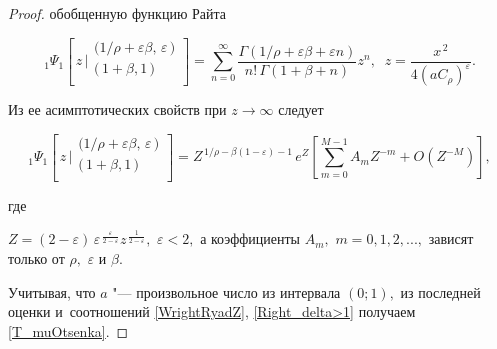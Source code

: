 \begin{proof}
обобщенную функцию Райта

$$

{_1\Psi_{1}}\left[ \,z \,\bigg|

\begin{array}{ll}

 \big(1/\rho+\varepsilon\beta, \,\varepsilon\,\big)\\

\big(\,1+\beta, 1\,\big)\\

\end{array}

\right]=

\sum\limits_{n=0}^{\infty}

\frac{\Gamma\left(1/\rho+\varepsilon\beta+\varepsilon n\right)}{n!

\,\Gamma(1+\beta+n)} z^{n}, \; \; z=\frac{x^{\,2}}{4(aC_{\rho})^{\varepsilon}}.

$$

Из ее асимптотических свойств при $z\to \infty$ следует~\cite{Wright}

$$

{_1\Psi_{1}}\left[ \,z\,\bigg|

\begin{array}{ll}

 \big(1/\rho+\varepsilon\beta, \,\varepsilon\,\big)\\

\big(\,1+\beta, 1\,\big)\\

\end{array}

\right]=Z^{\,1/\rho-\beta(1-\varepsilon)-1}\,e^{Z}

\left[ \sum\limits_{m=0}^{M-1}A_m Z^{-m}+O\left(Z^{-M}\right) \right],

$$

где

$Z=(2-\varepsilon)\,\varepsilon^{\,\frac{\varepsilon}{2-\varepsilon}}z^{\,\frac{1}{2-\varepsilon}},$  $\varepsilon<2,$ а коэффициенты $A_m,$ $m=0, 1, 2, ...,$ зависят только от $\rho,$ $\varepsilon$ и $\beta.$



Учитывая, что $a$ "--- произвольное число из интервала $(0;1),$ из последней оценки и~соотношений \eqref{WrightRyadZ}, \eqref{Right_delta>1} получаем \eqref{T_muOtsenka}. \hfill \end{proof}



\smallskip



